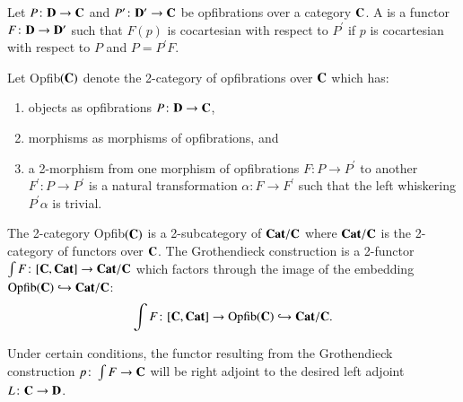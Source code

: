 \documentclass{amsart}
\begin{document}
\begin{defn}
Let $P \colon \bold{D} \to \bold{C}$ and $P^\prime \colon \bold{D^\prime} \to \bold{C}$ be opfibrations over a category $\bold{C}$. A  is a functor $F \colon \bold{D} \to \bold{D}^\prime$ such that $F(p)$ is cocartesian with respect to $P^\prime$ if $p$ is cocartesian with respect to $P$ and $P=P^\prime F$.
\end{defn}

Let Opfib$(\bold{C})$ denote the 2-category of opfibrations over $\bold{C}$ which has:
\begin{enumerate}
\item{objects as opfibrations $P \colon \bold{D} \to \bold{C}$,}
\item{morphisms as morphisms of opfibrations, and}
\item{a 2-morphism from one morphism of opfibrations $F \colon P \to P^\prime$ to another $F^\prime \colon P \to P^\prime$ is a natural transformation $\alpha \colon F \to F^\prime$ such that the left whiskering $P^\prime \alpha$ is trivial.}
\end{enumerate}

The 2-category Opfib$(\bold{C})$ is a 2-subcategory of $\bold{Cat}/ \bold{C}$ where $\bold{Cat} / \bold{C}$ is the 2-category of functors over $\bold{C}$. The Grothendieck construction is a 2-functor $\int F \colon [ \bold{C},\bold{Cat}] \to \bold{Cat}/ \bold{C}$ which factors through the image of the embedding $\textnormal{Opfib}(\bold{C}) \hookrightarrow \bold{Cat} / \bold{C}$: $$\int F \colon [ \bold{C}, \bold{Cat} ] \to \textnormal{Opfib}(\bold{C}) \hookrightarrow \bold{Cat} / \bold{C}.$$

Under certain conditions, the functor resulting from the Grothendieck construction $p \colon \int{F} \to \bold{C}$ will be right adjoint to the desired left adjoint $L \colon \bold{C} \to \bold{D}$.
\end{document}
